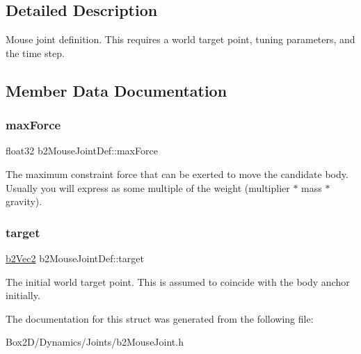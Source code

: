 \subsection{Detailed Description}
Mouse joint definition. This requires a world target point, tuning parameters, and the time step. 

\subsection{Member Data Documentation}
\mbox{\label{structb2_mouse_joint_def_ae9c52b3afda8ed006eb62fad163cdc3b}} 
\subsubsection{\texorpdfstring{max\+Force}{maxForce}}
{\footnotesize\ttfamily float32 b2\+Mouse\+Joint\+Def\+::max\+Force}

The maximum constraint force that can be exerted to move the candidate body. Usually you will express as some multiple of the weight (multiplier $\ast$ mass $\ast$ gravity). \mbox{\label{structb2_mouse_joint_def_aa1b76f72df9aca8d42bdc3e9922e310a}} 
\subsubsection{\texorpdfstring{target}{target}}
{\footnotesize\ttfamily \hyperlink{structb2_vec2}{b2\+Vec2} b2\+Mouse\+Joint\+Def\+::target}

The initial world target point. This is assumed to coincide with the body anchor initially. 

The documentation for this struct was generated from the following file\+:\begin{DoxyCompactItemize}
\item 
Box2\+D/\+Dynamics/\+Joints/b2\+Mouse\+Joint.\+h\end{DoxyCompactItemize}
